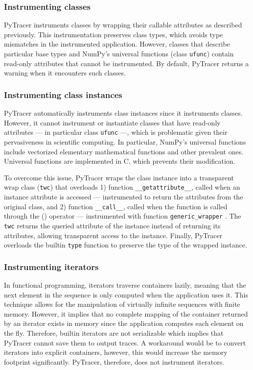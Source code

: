 \documentclass[11pt]{article}
\newcommand{\pytracer}[0]{PyTracer\xspace}
\begin{document}
\subsubsection{Instrumenting classes}

\pytracer instruments classes by wrapping their callable attributes as described previously. 
This instrumentation preserves class types, which avoids type mismatches in the instrumented application.
However, classes that describe particular base types and NumPy's universal functions (class \texttt{ufunc}) contain read-only attributes that cannot be instrumented.
By default, \pytracer returns a warning when it encounters such classes. 

\subsubsection{Instrumenting class instances}

\pytracer automatically instruments class instances since it instruments classes. However, it cannot instrument or instantiate classes that have read-only attributes --- in particular class \texttt{ufunc} ---, which is problematic given their pervasiveness in scientific computing. In particular, NumPy's universal functions include
vectorized elementary mathematical functions and other prevalent ones. Universal functions are implemented in C, which prevents their modification.

To overcome this issue, \pytracer wraps the class instance into a transparent wrap class (\texttt{twc}) that overloads
1) function \texttt{\_\_getattribute\_\_}, called when an instance attribute is accessed --- instrumented to return the attributes from the original class, and 2) function \texttt{\_\_call\_\_}, called when the function is called through the () operator --- instrumented with function \texttt{generic\_wrapper} . The \texttt{twc} returns the queried attribute of the instance instead of returning its attributes, allowing transparent access to the instance.  Finally, \pytracer overloads the builtin \texttt{type} function to preserve the type of the wrapped instance.

\subsubsection{Instrumenting iterators}

In functional programming, iterators traverse containers lazily, meaning that the next element in the sequence is only computed when the application uses it. This technique allows for the manipulation of virtually infinite sequences with finite memory. However, it implies that no complete mapping of the container returned by an iterator exists in memory since the application computes each element on the fly. Therefore, builtin iterators are not serializable which implies that \pytracer cannot save them to output traces. 
A workaround would be to convert iterators into explicit containers, however, this would increase the memory footprint significantly. \pytracer, therefore, does not instrument iterators.
\end{document}
